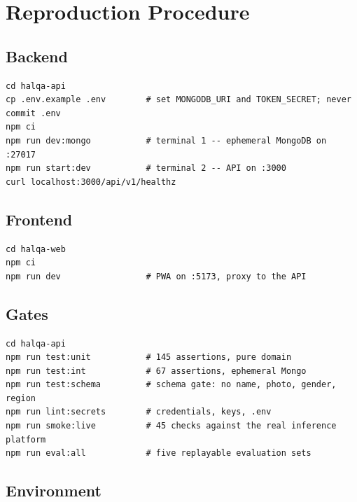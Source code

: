 \chapter{Reproduction Procedure}
\label{app:repro}

\section{Backend}

\begin{lstlisting}[caption={API from a clean checkout. Five steps.}]
cd halqa-api
cp .env.example .env        # set MONGODB_URI and TOKEN_SECRET; never commit .env
npm ci
npm run dev:mongo           # terminal 1 -- ephemeral MongoDB on :27017
npm run start:dev           # terminal 2 -- API on :3000
curl localhost:3000/api/v1/healthz
\end{lstlisting}

\section{Frontend}

\begin{lstlisting}[caption={Web client from a clean checkout. The build fails by design without VITE\_API\_BASE.}]
cd halqa-web
npm ci
npm run dev                 # PWA on :5173, proxy to the API
\end{lstlisting}

\section{Gates}

\begin{lstlisting}[caption={The four local gates, and the end-to-end verification.}]
cd halqa-api
npm run test:unit           # 145 assertions, pure domain
npm run test:int            # 67 assertions, ephemeral Mongo
npm run test:schema         # schema gate: no name, photo, gender, region
npm run lint:secrets        # credentials, keys, .env
npm run smoke:live          # 45 checks against the real inference platform
npm run eval:all            # five replayable evaluation sets
\end{lstlisting}

\section{Environment}

